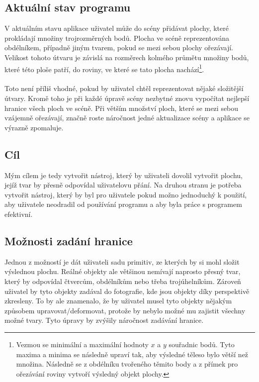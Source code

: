 \documentclass[11pt,twoside,a4paper]{book}
\begin{document}
\subsection{Aktuální stav programu}
V aktuálním stavu aplikace uživatel může do scény přidávat plochy, které prokládají množiny trojrozměrných bodů. Plocha ve scéně reprezentována obdélníkem, případně jiným tvarem, pokud se mezi sebou plochy ořezávají. Velikost tohoto útvaru je závislá na rozměrech kolmého průmětu množiny bodů, které této ploše patří, do roviny, ve které se tato plocha nachází\footnote{Vezmou se minimální a maximální hodnoty $x$ a $y$ souřadnic bodů. Tyto maxima a minima se následně upraví tak, aby výsledné těleso bylo větší než množina. Následně se z obdélníku tvořeného těmito body a z přímek pro ořezávání roviny vytvoří výsledný objekt plochy.}.
\paragraph{}
Toto není příliš vhodné, pokud by uživatel chtěl reprezentovat nějaké složitější útvary. Kromě toho je při každé úpravě scény nezbytné znovu vypočítat nejlepší hranice všech ploch ve scéně. Při větším množství ploch, které se mezi sebou vzájemně ořezávají, značně roste náročnost jedné aktualizace scény a aplikace se výrazně zpomaluje. 

\subsection{Cíl}
Mým cílem je tedy vytvořit nástroj, který by uživateli dovolil vytvořit plochu, jejíž tvar by přesně odpovídal uživatelovu přání. Na druhou stranu je potřeba vytvořit nástroj, který by byl pro uživatele pokud možno jednoduchý k použití, aby uživatele neodradil od používání programu a aby byla práce s programem efektivní. 

\subsection{Možnosti zadání hranice}
Jednou z možností je dát uživateli sadu primitiv, ze kterých by si mohl složit výslednou plochu. Reálné objekty ale většinou nemívají naprosto přesný tvar, který by odpovídal čtvercům, obdélníkům nebo třeba trojúhelníkům. Zároveň uživatel by tyto objekty zadával do fotografie, kde jsou objekty díky perspektivě zkresleny. To by ale znamenalo, že by uživatel musel tyto objekty nějakým způsobem upravovat/deformovat, protože by nebylo možné mu zajistit všechny možné tvary. Tyto úpravy by zvýšily náročnost zadávání hranice.
\end{document}
